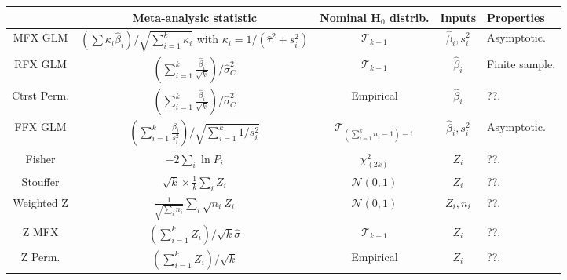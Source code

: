 \documentclass[preprint]{elsarticle}
\newcommand{\effectvector}{\hat\beta}
\newcommand{\effect}[1][i]{\effectvector_{#1}}
\newcommand{\vareffect}[1][i]{s^2_{#1}}
\newcommand{\zeffect}[1][\studyidx]{Z_{#1}}
\newcommand{\peffect}[1][\studyidx]{P_{#1}}
\newcommand{\nStudies}{k}
\newcommand{\studyidx}{i}
\newcommand{\varCombined}{\sigma^2_{C}}
\newcommand{\estvarBetween}{\hat\tau^2}
\newcommand{\sampleSize}[1][i]{n_{#1}}
\newcommand{\IGE}{IGE}
\newcommand{\ISE}{ISE}
\begin{document}
\begin{table*}[t]
\begin{center}
\setlength{\tabcolsep}{3pt}
\begin{tabular}{ccccl}
				& Meta-analysic statistic			& Nominal H$_0$ distrib. & Inputs & Properties\\
\hline						
MFX GLM 		& $ \left( \sum \kappa_i \effect \right) / \sqrt{\sum_{i=1}^\nStudies \kappa_i}$ with $\kappa_i = 1/(\estvarBetween + \vareffect)$ & $\mathcal{T}_{\nStudies - 1}$ & $\effect, \vareffect$& Asymptotic.\\
RFX GLM 		& $  \left( \sum_{i=1}^\nStudies \frac{\effect}{\sqrt{\nStudies} } \right) / \widehat\varCombined  $ & $\mathcal{T}_{\nStudies - 1}$ & $\effect$ & Finite sample.\\
Ctrst Perm.	& $ \left( \sum_{i=1}^\nStudies \frac{\effect}{\sqrt{\nStudies}} \right) /\widehat\varCombined  $ & Empirical & $\effect$ & ??.\\
FFX GLM 		& $  \left(  \sum_{i=1}^{\nStudies}  \frac{\effect}{\vareffect} \right) / \sqrt{\sum_{i=1}^\nStudies 1/\vareffect } $ & $\mathcal{T}_{ (\sum_{i=1}^\nStudies n_i - 1) - 1}$ & $\effect, \vareffect$ 
& Asymptotic.\\
Fisher	& $ \displaystyle -2 \sum_{\studyidx} \ln \peffect $ & $\chi^2_{(2\nStudies)}$ & $\zeffect$ & ??.\\
Stouffer& $ \displaystyle \sqrt{\nStudies} \times \frac{1}{\nStudies} \sum_{\studyidx} \zeffect $ & $\mathcal{N}(0,1)$ & $\zeffect$& ??.\\
Weighted Z& $  \displaystyle \frac{1}{\sqrt{\sum_{\studyidx} n_\studyidx}} \sum_{\studyidx}  \sqrt{n_\studyidx} \zeffect  $ & $\mathcal{N}(0,1)$ & $\zeffect, \sampleSize$& ??.\\
Z MFX& $ \left(   \sum_{i=1}^\nStudies \zeffect \right)/ \sqrt{\nStudies} \hat \sigma$ & $\mathcal{T}_{\nStudies-1}$ & $\zeffect$& ??.\\
Z Perm.	& $\left(  \sum_{i=1}^\nStudies \zeffect \right) / \sqrt{\nStudies}$ & Empirical & $\zeffect$ & ??.\\
\hline 

\end{tabular}
\end{center}
\caption{Statistics for one-sample meta-analysis tests and their sampling distributions under the null hypothesis $H_0$. Empirical null distributions are determined using permutations with sign flipping. \IGE=Independent Gaussian Errors, \ISE=Independent Symmetric Errors. Note: $\peffect = \Phi(-\zeffect)$, $\widehat\varCombined$ is the unbiased sample variance.}
\label{table:stats_test1}
\end{table*}	
\end{document}

